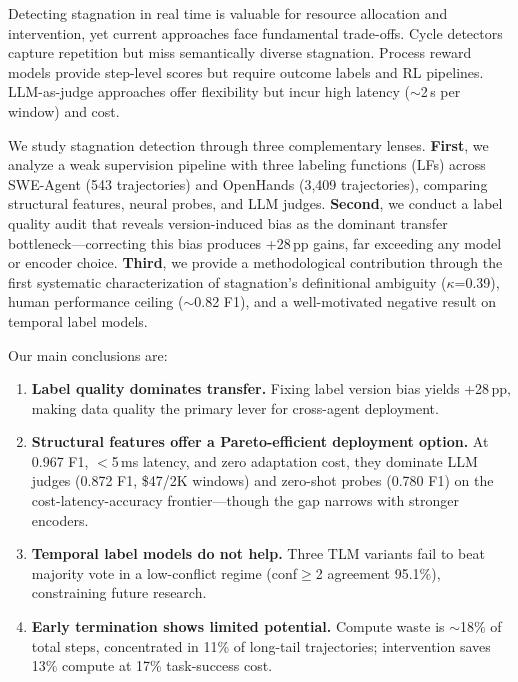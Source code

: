 \documentclass[11pt,a4paper]{article}
\begin{document}
Detecting stagnation in real time is valuable for resource allocation and intervention, yet current approaches face fundamental trade-offs.
Cycle detectors \cite{chen2024cdcs,zhang2025specra} capture repetition but miss semantically diverse stagnation.
Process reward models \cite{xi2026agentprm,lightman2023prm} provide step-level scores but require outcome labels and RL pipelines.
LLM-as-judge approaches \cite{zheng2024judging} offer flexibility but incur high latency ($\sim$2\,s per window) and cost.

We study stagnation detection through three complementary lenses.
\textbf{First}, we analyze a weak supervision pipeline with three labeling functions (LFs) across SWE-Agent (543 trajectories) and OpenHands (3{,}409 trajectories), comparing structural features, neural probes, and LLM judges.
\textbf{Second}, we conduct a label quality audit that reveals version-induced bias as the dominant transfer bottleneck---correcting this bias produces +28\,pp gains, far exceeding any model or encoder choice.
\textbf{Third}, we provide a methodological contribution through the first systematic characterization of stagnation's definitional ambiguity ($\kappa$=0.39), human performance ceiling ($\sim$0.82 F1), and a well-motivated negative result on temporal label models.

Our main conclusions are:
\begin{enumerate}
    \item \textbf{Label quality dominates transfer.} Fixing label version bias yields +28\,pp, making data quality the primary lever for cross-agent deployment.
    \item \textbf{Structural features offer a Pareto-efficient deployment option.} At 0.967 F1, $<$5\,ms latency, and zero adaptation cost, they dominate LLM judges (0.872 F1, \$47/2K windows) and zero-shot probes (0.780 F1) on the cost-latency-accuracy frontier---though the gap narrows with stronger encoders.
    \item \textbf{Temporal label models do not help.} Three TLM variants fail to beat majority vote in a low-conflict regime (conf$\geq$2 agreement 95.1\%), constraining future research.
    \item \textbf{Early termination shows limited potential.} Compute waste is $\sim$18\% of total steps, concentrated in 11\% of long-tail trajectories; intervention saves 13\% compute at 17\% task-success cost.
\end{enumerate}

\end{document}
